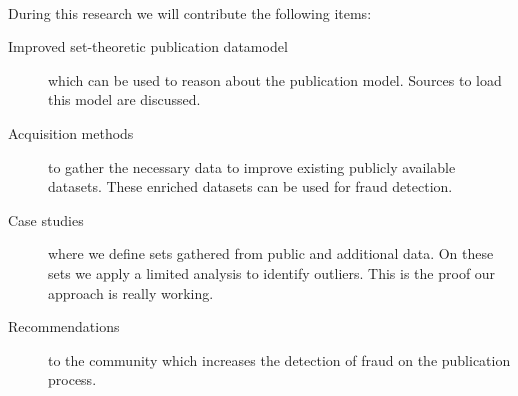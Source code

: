 \documentclass{ou-report}
\newcommand{\outline}[1]{{\color{blue} #1}}
\newcommand{\old}[1]{{\color{gray} #1}}
\begin{document}
\paragraph{}
During this research we will contribute the following items:
\begin{description}
    \item[Improved set-theoretic publication datamodel] which can be used to 
        reason about the publication model. Sources to load this model are 
        discussed.
    \item[Acquisition methods] to gather the necessary data to improve existing 
        publicly available datasets. These enriched datasets can be used for
        fraud detection.
    \item[Case studies] where we define sets gathered from public and additional
        data. On these sets we apply a limited analysis to identify 
        outliers. This is the proof our approach is really working.
    \item[Recommendations] to the community which increases the detection of 
        fraud on the publication process. 
\end{description}
\end{document}
